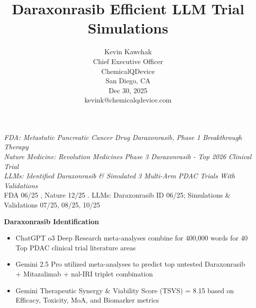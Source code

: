 \documentclass{article}
\title{Daraxonrasib Efficient LLM Trial Simulations}
\author{ \large
  Kevin Kawchak \orcidlink{0009-0007-5457-8667} \\
  \large Chief Executive Officer \\
  \large ChemicalQDevice \\
  \large San Diego, CA\\
  \large Dec 30, 2025\\
  \vspace{-0.24cm}
  \large kevink@chemicalqdevice.com \\
}
\begin{document}
\maketitle
 
\vspace{-0.1cm}

\fontsize{14pt}{15pt}\selectfont \centering \textit{FDA: Metastatic Pancreatic Cancer Drug Daraxonrasib, Phase 1 Breakthrough Therapy}\\ \fontsize{14pt}{15pt}\selectfont \centering
\vspace{0.065cm}
\textit{Nature Medicine: Revolution Medicines Phase 3 Daraxonrasib - Top 2026 Clinical Trial}\\  
\vspace{0.065cm}
\textit{LLMs: Identified Daraxonrasib \& Simulated 3 Multi-Arm PDAC Trials With Validations}\\ \normalsize
\vspace{0.15cm} 
\centering
FDA 06/25 \cite{RevBreakthrough}, Nature 12/25 \cite{ElevenTrials2026}. LLMs: Daraxonrasib ID 06/25; Simulations \& Validations 07/25, 08/25, 10/25 \cite{04KawchakEndToEnd, 16KawchakPaper, 17KawchakPaper, 18KawchakPaper} \\
 

\vspace{0.3cm}

\raggedright \textbf{Daraxonrasib Identification} \cite{04KawchakEndToEnd}
\vspace{-0.1em}
\begin{itemize}[leftmargin=2.5em, itemsep=0em, topsep=0em]
    \item[1)] ChatGPT o3 Deep Research meta-analyses combine for \raisebox{0.3ex}{\scalebox{0.75}>}400,000 words for 40 Top PDAC clinical trial literature areas
    \item[2)] Gemini 2.5 Pro utilized meta-analyses to predict top untested Daraxonrasib + Mitazalimab + nal-IRI triplet combination
    \item[3)] Gemini Therapeutic Synergy \& Viability Score (TSVS) = 8.15 based on Efficacy, Toxicity, MoA, and Biomarker metrics
\end{itemize}
\vspace{0.1cm}
\end{document}

